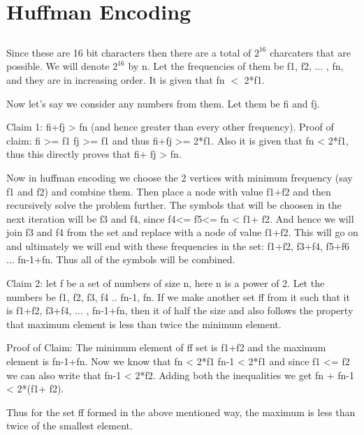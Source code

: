 \documentclass{article}
\begin{document}
\section{Huffman Encoding}
\subsection{}

\subsection{}

Since these are 16 bit characters then there are a total of $2^{16}$ charcaters that are possible. We will denote $2^{16}$ by n. Let the frequencies of them be f1, f2, ... , fn, and they are in increasing order. It is given that fn $<$ 2*f1.

Now let's say we consider any numbers from them. Let them be fi and fj. 

Claim 1: fi+fj > fn (and hence greater than every other frequency). 
Proof of claim: fi >= f1
fj >= f1
and thus fi+fj >= 2*f1. 
Also it is given that fn < 2*f1, thus this directly proves that fi+ fj > fn. 

Now in huffman encoding we choose the 2 vertices with minimum frequency (say f1 and f2) and combine them. Then place a node with value f1+f2 and then recursively solve the problem further. The symbols that will be choosen in the next iteration will be f3 and f4, since f4<= f5<= fn < f1+ f2. And hence we will join f3 and f4 from the set and replace with a node of value f1+f2. This will go on and ultimately we will end with these frequencies in the set: f1+f2, f3+f4, f5+f6 ... fn-1+fn. Thus all of the symbols will be combined.

Claim 2: let f be a set of numbers of size n, here n is a power of 2. Let the numbers be f1, f2, f3, f4 .. fn-1, fn. If we make another set ff from it such that it is f1+f2, f3+f4, ... ,  fn-1+fn, then it of half the size and also follows the property that maximum element is less than twice the minimum element. 

Proof of Claim: The minimum element of ff set is f1+f2 and the maximum element is fn-1+fn. Now we know that 
fn < 2*f1
fn-1 < 2*f1
and since f1 <= f2 we can also write that fn-1 < 2*f2.
Adding both the inequalities we get fn + fn-1 < 2*(f1+ f2).

Thus for the set ff formed in the above mentioned way, the maximum is less than twice of the smallest element. 
\end{document}
